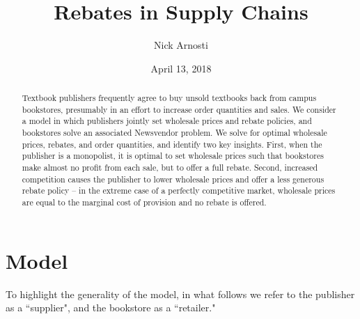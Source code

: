 \documentclass[11pt, oneside,margin=1in]{article}   	%
\title{\vspace{-.7 in} Rebates in Supply Chains}
\author{Nick Arnosti}
\date{April 13, 2018}							%
\begin{document}
\maketitle

\begin{abstract}
Textbook publishers frequently agree to buy unsold textbooks back from campus bookstores, presumably in an effort to increase order quantities and sales. We consider a model in which publishers jointly set wholesale prices and rebate policies, and bookstores solve an associated Newsvendor problem. We solve for optimal wholesale prices, rebates, and order quantities, and identify two key insights. First, when the publisher is a monopolist, it is optimal to set wholesale prices such that bookstores make almost no profit from each sale, but to offer a full rebate. Second, increased competition causes the publisher to lower  wholesale prices and offer a less generous rebate policy -- in the extreme case of a perfectly competitive market, wholesale prices are equal to the marginal cost of provision and no rebate is offered. %
\end{abstract}



\section{Model}

To highlight the generality of the model, in what follows we refer to the publisher as a ``supplier", and the bookstore as a ``retailer."
\end{document}
